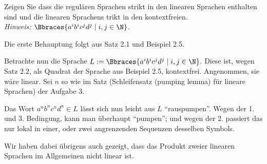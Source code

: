 
\begin{exercise}

Zeigen Sie dass die regulären Sprachen strikt in den linearen Sprachen enthalten sind und die linearen Sprachens trikt in den kontextfreien. \\

\textit{Hinweis: $\Bbraces{a^i b^i c^j d^j \mid i, j \in \N}$.}

\end{exercise}


\begin{solution}

Die erste Behauptung folgt aus Satz 2.1 und Beispiel 2.5.

Betrachte nun die Sprache $L := \Bbraces{a^i b^i c^j d^j \mid i, j \in \N}$.
Diese ist, wegen Satz 2.2, als Quadrat der Sprache aus Beispiel 2.5, kontextfrei.
Angenommen, sie wäre linear.
Sei $n$ so wie im Satz (Schleifensatz (pumping lemma) für lineare Sprachen) der Aufgabe 3.

Das Wort $a^n b^n c^n d^n \in L$ lässt sich nun leicht aus $L$ \enquote{rauspumpen}.
Wegen der 1. und 3. Bedingung, kann man überhaupt \enquote{pumpen};
und wegen der 2. passiert das nur lokal in einer, oder zwei angrenzenden Sequenzen desselben Symbols.

Wir haben dabei übrigens auch gezeigt, dass das Produkt zweier linearen Sprachen im Allgemeinen nicht linear ist.

\end{solution}

